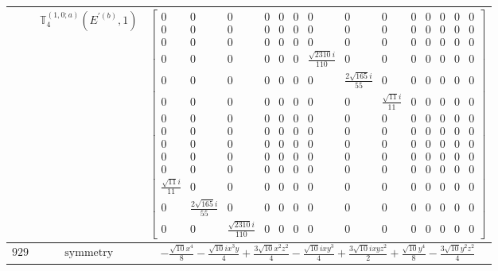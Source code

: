 \documentclass[fleqn,8pt,landscape]{jsarticle}
\begin{document}
\begin{longtable}{ccc}
$  $ & $ \mathbb{T}_{4}^{(1,0;a)}(E^{\prime(b)},1) $ & $ \begin{bmatrix} 0 & 0 & 0 & 0 & 0 & 0 & 0 & 0 & 0 & 0 & 0 & 0 & 0 & 0 \\ 0 & 0 & 0 & 0 & 0 & 0 & 0 & 0 & 0 & 0 & 0 & 0 & 0 & 0 \\ 0 & 0 & 0 & 0 & 0 & 0 & 0 & 0 & 0 & 0 & 0 & 0 & 0 & 0 \\ 0 & 0 & 0 & 0 & 0 & 0 & \frac{\sqrt{2310} i}{110} & 0 & 0 & 0 & 0 & 0 & 0 & 0 \\ 0 & 0 & 0 & 0 & 0 & 0 & 0 & \frac{2 \sqrt{165} i}{55} & 0 & 0 & 0 & 0 & 0 & 0 \\ 0 & 0 & 0 & 0 & 0 & 0 & 0 & 0 & \frac{\sqrt{11} i}{11} & 0 & 0 & 0 & 0 & 0 \\ 0 & 0 & 0 & 0 & 0 & 0 & 0 & 0 & 0 & 0 & 0 & 0 & 0 & 0 \\ 0 & 0 & 0 & 0 & 0 & 0 & 0 & 0 & 0 & 0 & 0 & 0 & 0 & 0 \\ 0 & 0 & 0 & 0 & 0 & 0 & 0 & 0 & 0 & 0 & 0 & 0 & 0 & 0 \\ 0 & 0 & 0 & 0 & 0 & 0 & 0 & 0 & 0 & 0 & 0 & 0 & 0 & 0 \\ 0 & 0 & 0 & 0 & 0 & 0 & 0 & 0 & 0 & 0 & 0 & 0 & 0 & 0 \\ \frac{\sqrt{11} i}{11} & 0 & 0 & 0 & 0 & 0 & 0 & 0 & 0 & 0 & 0 & 0 & 0 & 0 \\ 0 & \frac{2 \sqrt{165} i}{55} & 0 & 0 & 0 & 0 & 0 & 0 & 0 & 0 & 0 & 0 & 0 & 0 \\ 0 & 0 & \frac{\sqrt{2310} i}{110} & 0 & 0 & 0 & 0 & 0 & 0 & 0 & 0 & 0 & 0 & 0 \end{bmatrix} $ \\ \hline
$ 929 $ & $ \text{symmetry} $ & $ - \frac{\sqrt{10} x^{4}}{8} - \frac{\sqrt{10} i x^{3} y}{4} + \frac{3 \sqrt{10} x^{2} z^{2}}{4} - \frac{\sqrt{10} i x y^{3}}{4} + \frac{3 \sqrt{10} i x y z^{2}}{2} + \frac{\sqrt{10} y^{4}}{8} - \frac{3 \sqrt{10} y^{2} z^{2}}{4} $ \\

\end{longtable}
\end{document}

